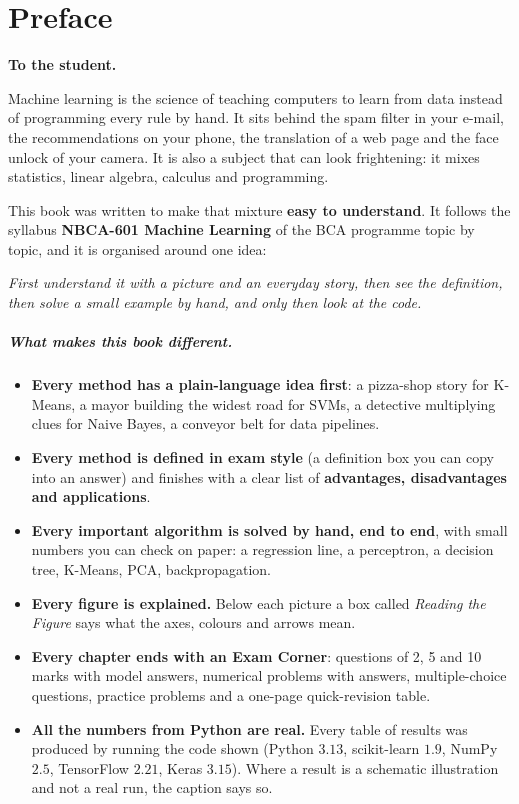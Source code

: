 \chapter*{Preface}

\textbf{To the student.}

Machine learning is the science of teaching computers to learn from data instead of programming every rule by hand. It sits behind the spam filter in your e-mail, the recommendations on your phone, the translation of a web page and the face unlock of your camera. It is also a subject that can look frightening: it mixes statistics, linear algebra, calculus and programming.

This book was written to make that mixture \textbf{easy to understand}. It follows the syllabus \textbf{NBCA-601 Machine Learning} of the BCA programme topic by topic, and it is organised around one idea:

\begin{center}
\emph{First understand it with a picture and an everyday story, then see the definition, then solve a small example by hand, and only then look at the code.}
\end{center}

\paragraph{What makes this book different.}
\begin{itemize}
  \item \textbf{Every method has a plain-language idea first}: a pizza-shop story for K-Means, a mayor building the widest road for SVMs, a detective multiplying clues for Naive Bayes, a conveyor belt for data pipelines.
  \item \textbf{Every method is defined in exam style} (a definition box you can copy into an answer) and finishes with a clear list of \textbf{advantages, disadvantages and applications}.
  \item \textbf{Every important algorithm is solved by hand, end to end}, with small numbers you can check on paper: a regression line, a perceptron, a decision tree, K-Means, PCA, backpropagation.
  \item \textbf{Every figure is explained.} Below each picture a box called \emph{Reading the Figure} says what the axes, colours and arrows mean.
  \item \textbf{Every chapter ends with an Exam Corner}: questions of 2, 5 and 10 marks with model answers, numerical problems with answers, multiple-choice questions, practice problems and a one-page quick-revision table.
  \item \textbf{All the numbers from Python are real.} Every table of results was produced by running the code shown (Python $3.13$, scikit-learn $1.9$, NumPy $2.5$, TensorFlow $2.21$, Keras $3.15$). Where a result is a schematic illustration and not a real run, the caption says so.
\end{itemize}

